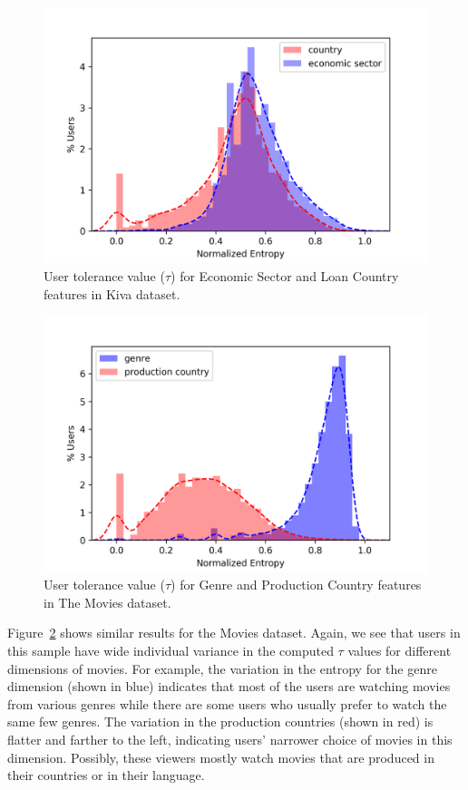 \begin{figure}[tbh]
    \centering
    \includegraphics[width=\linewidth]{imgs/ofair/kiva_user_entropy_distribitions_lineDist.png}
    \caption{User tolerance value ($\tau$) for Economic Sector and Loan Country features in Kiva dataset.}
    \label{fig:tau_vector_Kiva}
\end{figure}


\begin{figure}[tbh]
    \centering
    \includegraphics[width=\linewidth]{imgs/ofair/ml_user_entropy_distribitions_lineDist.png}
    \caption{User tolerance value ($\tau$) for Genre and Production Country features in The Movies dataset.}
    \label{fig:tau_vector_ML}
\end{figure}

Figure~\ref{fig:tau_vector_ML} shows similar results for the Movies dataset. Again, we see that users in this sample have wide individual variance in the computed $\tau$ values for different dimensions of movies. For example, the variation in the entropy for the genre dimension (shown in blue) indicates that most of the users are watching movies from various genres while there are some users who usually prefer to watch the same few genres. The variation in the production countries (shown in red) is flatter and farther to the left, indicating users' narrower choice of movies in this dimension. Possibly, these viewers mostly watch movies that are produced in their countries or in their language.

